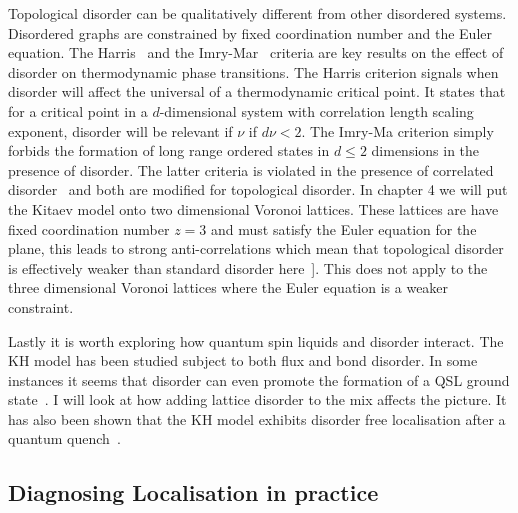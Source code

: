 Topological disorder can be qualitatively different from other disordered systems. Disordered graphs are constrained by fixed coordination number and the Euler equation. The Harris~\autocite{harrisEffectRandomDefects1974} and the Imry-Mar~\autocite{imryRandomFieldInstabilityOrdered1975} criteria are key results on the effect of disorder on thermodynamic phase transitions. The Harris criterion signals when disorder will affect the universal of a thermodynamic critical point. It states that for a critical point in a \(d\)-dimensional system with correlation length scaling exponent, disorder will be relevant if \(\nu\) if \(d\nu < 2\). The Imry-Ma criterion simply forbids the formation of long range ordered states in \(d \leq 2\) dimensions in the presence of disorder. The latter criteria is violated in the presence of correlated disorder~\autocite{changlaniChargeDensityWaves2016} and both are modified for topological disorder. In chapter 4 we will put the Kitaev model onto two dimensional Voronoi lattices. These lattices are have fixed coordination number \(z=3\) and must satisfy the Euler equation for the plane, this leads to strong anti-correlations which mean that topological disorder is effectively weaker than standard disorder here~\autocite{barghathiPhaseTransitionsRandom2014,schrauthViolationHarrisBarghathiVojtaCriterion2018}{]}. This does not apply to the three dimensional Voronoi lattices where the Euler equation is a weaker constraint.

Lastly it is worth exploring how quantum spin liquids and disorder interact. The KH model has been studied subject to both flux \autocite{Nasu_Thermal_2015} and bond \autocite{knolle_dynamics_2016} disorder. In some instances it seems that disorder can even promote the formation of a QSL ground state~\autocite{wenDisorderedRouteCoulomb2017}. I will look at how adding lattice disorder to the mix affects the picture. It has also been shown that the KH model exhibits disorder free localisation after a quantum quench~\autocite{zhuSubdiffusiveDynamicsCritical2021}.

\hypertarget{diagnosing-localisation-in-practice}{%
\subsection{Diagnosing Localisation in practice}\label{diagnosing-localisation-in-practice}}

